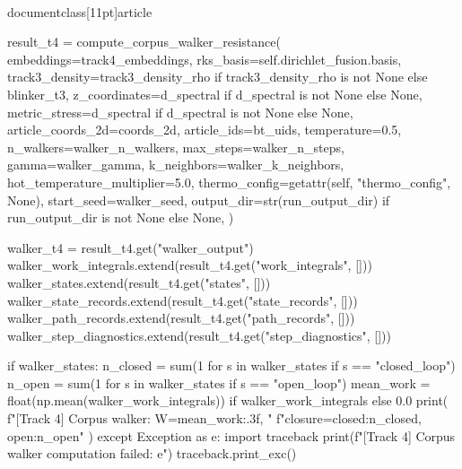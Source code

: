 \\documentclass[11pt]{article}
\begin{document}
\begin{CodeBlock}
                        result_t4 = compute_corpus_walker_resistance(
                            embeddings=track4_embeddings,
                            rks_basis=self.dirichlet_fusion.basis,
                            track3_density=track3_density_rho if track3_density_rho is not None else blinker_t3,
                            z_coordinates=d_spectral if d_spectral is not None else None,
                            metric_stress=d_spectral if d_spectral is not None else None,
                            article_coords_2d=coords_2d,
                            article_ids=bt_uids,
                            temperature=0.5,
                            n_walkers=walker_n_walkers,
                            max_steps=walker_n_steps,
                            gamma=walker_gamma,
                            k_neighbors=walker_k_neighbors,
                            hot_temperature_multiplier=5.0,
                            thermo_config=getattr(self, "thermo_config", None),
                            start_seed=walker_seed,
                            output_dir=str(run_output_dir) if run_output_dir is not None else None,
                        )

                        walker_t4 = result_t4.get("walker_output")
                        walker_work_integrals.extend(result_t4.get("work_integrals", []))
                        walker_states.extend(result_t4.get("states", []))
                        walker_state_records.extend(result_t4.get("state_records", []))
                        walker_path_records.extend(result_t4.get("path_records", []))
                        walker_step_diagnostics.extend(result_t4.get("step_diagnostics", []))

                        if walker_states:
                            n_closed = sum(1 for s in walker_states if s == "closed_loop")
                            n_open = sum(1 for s in walker_states if s == "open_loop")
                            mean_work = float(np.mean(walker_work_integrals)) if walker_work_integrals else 0.0
                            print(
                                f"[Track 4] Corpus walker: W={mean_work:.3f}, "
                                f"closure={{closed:{n_closed}, open:{n_open}}}"
                            )
                    except Exception as e:
                        import traceback
                        print(f"[Track 4] Corpus walker computation failed: {e}")
                        traceback.print_exc()


\end{CodeBlock}
\end{document}
